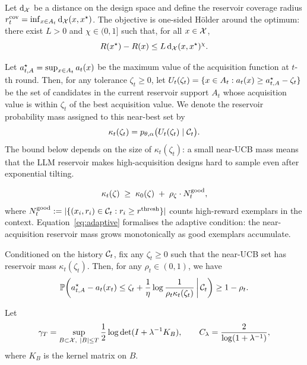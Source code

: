 \begin{assumption}
\label{ass:coverage}
Let $\mathrm d_{\mathcal{X}}$ be a distance on the design space and define the reservoir
coverage radius $r_t^{\rm cov}=\inf_{x\in A_t}\mathrm d_{\mathcal{X}}(x,x^\star)$. The objective is one-sided H\"older around the optimum: there exist $L>0$ and $\chi\in(0,1]$ such that, for all
$x\in\mathcal{X}$,
\[
R(x^\star)-R(x)\le L\,\mathrm d_{\mathcal{X}}(x,x^\star)^\chi.
\]
\end{assumption}
Let $a_{t,A}^\star=\sup_{x\in A_t}a_t(x)$ be the maximum value of the acquisition function at $t$-th round. Then, for any tolerance $\zeta_t\ge0$, let $U_t(\zeta_t)=
\{x\in A_t:a_t(x)\ge a_{t,A}^\star-\zeta_t\}$ be the set of candidates in the current reservoir support $A_t$ whose acquisition value is within $\zeta_t$ of the best acquisition value. We denote the reservoir probability mass assigned to this near-best set by
\begin{equation}
\label{eq:coverage}
\kappa_t(\zeta_t)=p_{\theta,\alpha}\bigl(U_t(\zeta_t)\mid\mathcal{C}_t\bigr).
\end{equation}
The bound below depends on the size of $\kappa_t(\zeta_t)$: a small near-UCB mass means that the LLM reservoir makes high-acquisition designs hard to sample even after exponential tilting.

\begin{equation}
\label{eq:adaptive}
\kappa_t(\zeta)\;\ge\;\kappa_0(\zeta)\;+\;\rho_\zeta\cdot N_t^{\rm good},
\end{equation}
where $N_t^{\rm good}:=|\{(x_i,r_i)\in\mathcal{C}_t : r_i \ge r^{\rm thresh}\}|$ counts high-reward exemplars in the
context. Equation~\eqref{eq:adaptive} formalises the adaptive condition: the near-acquisition reservoir mass grows monotonically as good exemplars
accumulate.

\begin{lemma}
\label{lem:gibbs-near-ucb}
Conditioned on the history \(\mathcal{C}_t\), fix any \(\zeta_t\ge 0\) such that the near-UCB set has reservoir mass \(\kappa_t(\zeta_t)\). Then, for any \(\rho_t\in(0,1)\), we have
\begin{equation}
 \mathbb P\!\left(
a_{t,A}^\star-a_t(x_t)
\le
\zeta_t+\frac{1}{\eta}\log\frac{1}{\rho_t\kappa_t(\zeta_t)}
\,\middle|\, \mathcal{C}_t
\right)
\ge
1-\rho_t .
\end{equation}

\end{lemma}

Let
\[
\gamma_T=
\sup_{B\subset\mathcal{X},\ |B|\le T}
\frac12\log\det(I+\lambda^{-1}K_B),
\qquad
C_\lambda=\frac{2}{\log(1+\lambda^{-1})},
\]
where $K_B$ is the kernel matrix on $B$.

